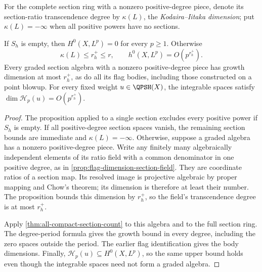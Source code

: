For the complete section ring with a nonzero positive-degree piece, denote its section-ratio transcendence degree by $\kappa(L)$, the \emph{Kodaira--Iitaka dimension}; put $\kappa(L)=-\infty$ when all positive powers have no sections.

\begin{corollary}\label{cor:curvature-rank-section-count}
If $S_h$ is empty, then $H^0(X,L^p)=0$ for every $p\geq1$. Otherwise
\[
 \kappa(L)\leq r_h^+\leq r,
 \qquad h^0(X,L^p)=O(p^{r_h^+}).
\]
Every graded section algebra with a nonzero positive-degree piece has growth dimension at most $r_h^+$, as do all its flag bodies, including those constructed on a point blowup. For every fixed weight $u\in\QPSH(X)$, the integrable spaces satisfy $\dim\mathcal H_p(u)=O(p^{r_h^+})$.
\end{corollary}
\begin{proof}
The proposition applied to a single section excludes every positive power if $S_h$ is empty. If all positive-degree section spaces vanish, the remaining section bounds are immediate and $\kappa(L)=-\infty$. Otherwise, suppose a graded algebra has a nonzero positive-degree piece. Write any finitely many algebraically independent elements of its ratio field with a common denominator in one positive degree, as in \cref{prop:flag-dimension-section-field}. They are coordinate ratios of a section map. Its resolved image is projective algebraic by proper mapping and Chow's theorem; its dimension is therefore at least their number. The proposition bounds this dimension by $r_h^+$, so the field's transcendence degree is at most $r_h^+$.

Apply \cref{thm:all-compact-section-count} to this algebra and to the full section ring. The degree-period formula gives the growth bound in every degree, including the zero spaces outside the period. The earlier flag identification gives the body dimensions. Finally, $\mathcal H_p(u)\subseteq H^0(X,L^p)$, so the same upper bound holds even though the integrable spaces need not form a graded algebra.
\end{proof}

